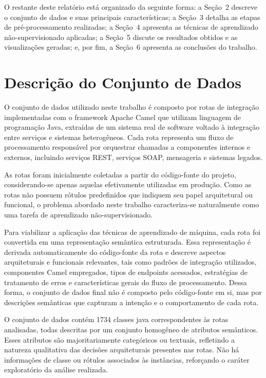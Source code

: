 \documentclass[12pt,a4paper]{article}
\begin{document}
O restante deste relatório está organizado da seguinte forma: a Seção~2 descreve o conjunto de dados e suas principais características; a Seção~3 detalha as etapas de pré-processamento realizadas; a Seção~4 apresenta as técnicas de aprendizado não-supervisionado aplicadas; a Seção~5 discute os resultados obtidos e as visualizações geradas; e, por fim, a Seção~6 apresenta as conclusões do trabalho.

\section{Descrição do Conjunto de Dados}

O conjunto de dados utilizado neste trabalho é composto por rotas de integração implementadas com o framework Apache Camel que utilizam linguagem de programação Java, extraídas de um sistema real de software voltado à integração entre serviços e sistemas heterogêneos. Cada rota representa um fluxo de processamento responsável por orquestrar chamadas a componentes internos e externos, incluindo serviços REST, serviços SOAP, mensageria e sistemas legados.

As rotas foram inicialmente coletadas a partir do código-fonte do projeto, considerando-se apenas aquelas efetivamente utilizadas em produção. Como as rotas não possuem rótulos predefinidos que indiquem seu papel arquitetural ou funcional, o problema abordado neste trabalho caracteriza-se naturalmente como uma tarefa de aprendizado não-supervisionado.

Para viabilizar a aplicação das técnicas de aprendizado de máquina, cada rota foi convertida em uma representação semântica estruturada. Essa representação é derivada automaticamente do código-fonte da rota e descreve aspectos arquiteturais e funcionais relevantes, tais como padrões de integração utilizados, componentes Camel empregados, tipos de endpoints acessados, estratégias de tratamento de erros e características gerais do fluxo de processamento. Dessa forma, o conjunto de dados final não é composto pelo código-fonte em si, mas por descrições semânticas que capturam a intenção e o comportamento de cada rota.

O conjunto de dados contém 1734 classes java correspondentes às rotas analisadas, todas descritas por um conjunto homogêneo de atributos semânticos. Esses atributos são majoritariamente categóricos ou textuais, refletindo a natureza qualitativa das decisões arquiteturais presentes nas rotas. Não há informações de classe ou rótulos associados às instâncias, reforçando o caráter exploratório da análise realizada.
\end{document}
